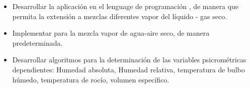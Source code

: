     \begin{itemize}
         
        \item Desarrollar la aplicación en el lenguage de programación \ldp, de manera que permita la extensión a mezclas diferentes vapor del líquido - gas seco.
        \item Implementar para la mezcla vapor de agua-aire seco, de manera predeterminada.
        \item Desarrollar algoritmos para la determinación de las variables psicrométricas dependientes: Humedad absoluta, Humedad relativa, temperatura de bulbo húmedo, temperatura de rocío, volumen específico. 
        
        


        


\end{itemize}
